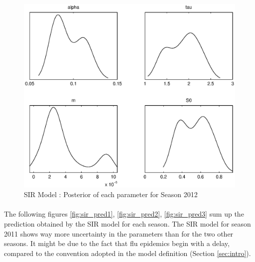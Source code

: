 \documentclass[11pt, a4paper]{article}
\begin{document}
\begin{figure}[H!]
    \includegraphics[height = 0.25\textheight]{figures/SIR_posterior_season3.eps}
    \caption{SIR Model : Posterior of each parameter for Season 2012}
    \label{fig:sir_post3}
\end{figure}


\paragraph{}
The following figures \ref{fig:sir_pred1}, \ref{fig:sir_pred2}, \ref{fig:sir_pred3} sum up the prediction obtained by the SIR model for each season. The SIR model for season 2011 shows way more uncertainty in the parameters than for the two other seasons. It might be due to the fact that flu epidemics begin with a delay, compared to the convention adopted in the model definition (Section \ref{sec:intro}).
\end{document}
